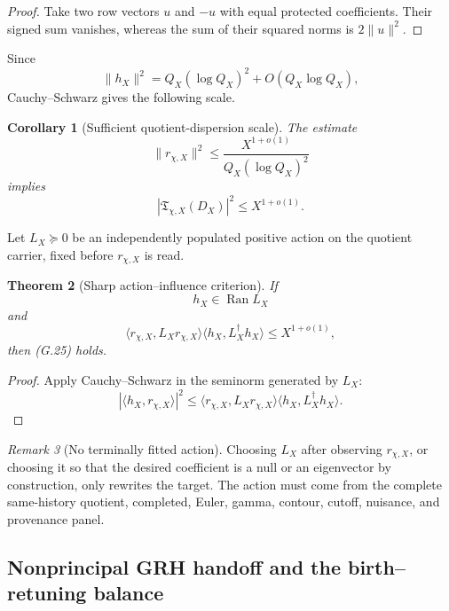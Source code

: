 \documentclass[11pt]{article}
\newtheorem{theorem}{Theorem}[section]
\newtheorem{corollary}[theorem]{Corollary}
\theoremstyle{definition}
\theoremstyle{remark}
\newtheorem{remark}[theorem]{Remark}
\newcommand{\Ran}{\operatorname{Ran}}
\begin{document}
\begin{proof}
Take two row vectors \(u\) and \(-u\) with equal protected coefficients.
Their signed sum vanishes, whereas the sum of their squared norms is
\(2\|u\|^2\).
\end{proof}

Since
\[
 \|h_X\|^2
 =Q_X(\log Q_X)^2+O(Q_X\log Q_X),
\]
Cauchy--Schwarz gives the following scale.

\begin{corollary}[Sufficient quotient-dispersion scale]
\label{cor:grhouter-L2-scale}
The estimate
\[
 \boxed{
 \|r_{\chi,X}\|^2
 \le
 \frac{X^{1+o(1)}}{Q_X(\log Q_X)^2}}
 \tag{G.24}
\]
implies
\[
 \boxed{
 |\mathfrak T_{\chi,X}(D_X)|^2\le X^{1+o(1)}.}
 \tag{G.25}
\]
\end{corollary}

Let \(L_X\succeq0\) be an independently populated positive action on the
quotient carrier, fixed before \(r_{\chi,X}\) is read.

\begin{theorem}[Sharp action--influence criterion]
\label{thm:grhouter-action-influence}
If
\[
 h_X\in\Ran L_X
\]
and
\[
 \boxed{
 \langle r_{\chi,X},L_Xr_{\chi,X}\rangle
 \langle h_X,L_X^\dagger h_X\rangle
 \le X^{1+o(1)},}
 \tag{G.26}
\]
then \textup{(G.25)} holds.
\end{theorem}

\begin{proof}
Apply Cauchy--Schwarz in the seminorm generated by \(L_X\):
\[
 |\langle h_X,r_{\chi,X}\rangle|^2
 \le
 \langle r_{\chi,X},L_Xr_{\chi,X}\rangle
 \langle h_X,L_X^\dagger h_X\rangle.
\]
\end{proof}

\begin{remark}[No terminally fitted action]
Choosing \(L_X\) after observing \(r_{\chi,X}\), or choosing it so that the
desired coefficient is a null or an eigenvector by construction, only rewrites
the target.  The action must come from the complete same-history quotient,
completed, Euler, gamma, contour, cutoff, nuisance, and provenance panel.
\end{remark}

\subsection{Nonprincipal GRH handoff and the birth--retuning balance}
\label{subsec:grhouter-GRH-handoff}
\end{document}
